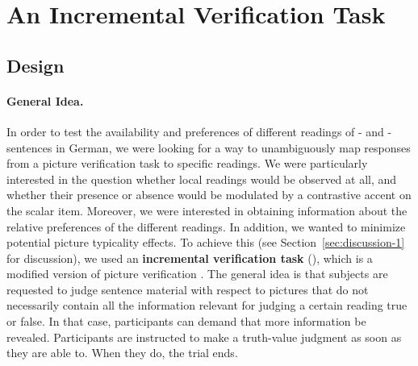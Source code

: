 \documentclass[fleqn,reqno,10pt]{article}
\newcommand{\as}{\acro{as}}
\renewcommand{\es}{\acro{es}}
\renewcommand{\mymark}[1]{\textbf{#1}}
\begin{document}
\section{An Incremental Verification Task}
\label{sec:exp}

\subsection{Design}
\label{sec:design}

\paragraph{General Idea.} In order to test the availability and
preferences of different readings of \as- and \es-sentences in German,
we were looking for a way to unambiguously map responses from a
picture verification task to specific readings. We were particularly
interested in the question whether local readings would be observed at
all, and whether their presence or absence would be modulated by a
contrastive accent on the scalar item. Moreover, we were interested in
obtaining information about the relative preferences of the different
readings. In addition, we wanted to minimize potential picture
typicality effects. To achieve this (see
Section~\ref{sec:discussion-1} for discussion), we used an
\mymark{incremental verification task} (), which is a
modified version of picture verification
\citep[see][]{Conroy2008}. The general idea is that subjects are
requested to judge sentence material with respect to pictures that do
not necessarily contain all the information relevant for judging a
certain reading true or false. In that case, participants can demand
that more information be revealed. Participants are instructed to make
a truth-value judgment as soon as they are able to. When they do, the
trial ends.
\end{document}
